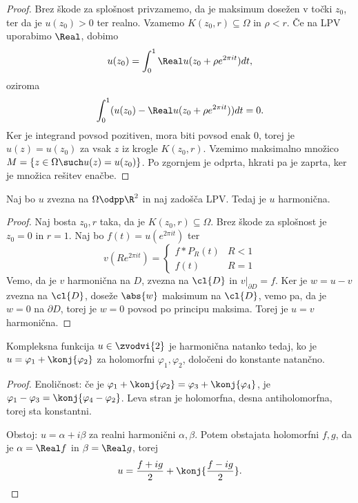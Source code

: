 \begin{proof}
  Brez škode za splošnost privzamemo, da je maksimum dosežen v točki $z_0$, ter
  da je $u(z_0) > 0$ ter realno.
  Vzamemo $K(z_0, r) \subseteq \Omega$ in $\rho < r$.
  Če na LPV uporabimo $\Real$, dobimo
  \[
	u(z_0) = \int_0^1 \Real u(z_0 + \rho e^{2 \pi i t}) dt,
  \]
  oziroma
  \[
	\int_0^1 (u(z_0) - \Real u(z_0 + \rho e^{2 \pi i t})) dt = 0.
  \]
  Ker je integrand povsod pozitiven, mora biti povsod enak $0$, torej je $u(z) =
  u(z_0)$ za vsak $z$ iz krogle $K(z_0, r)$.
  Vzemimo maksimalno množico $M = \{z \in \Omega \such u(z) = u(z_0)\}$.
  Po zgornjem je odprta, hkrati pa je zaprta, ker je množica rešitev enačbe.
\end{proof}


\begin{posledica}
  Naj bo $u$ zvezna na $\Omega\odpp\R^2$ in naj zadošča LPV.
  Tedaj je $u$ harmonična.
\end{posledica}

\begin{proof}
  Naj bosta $z_0, r$ taka, da je $K(z_0, r) \subseteq \Omega$.
  Brez škode za splošnost je $z_0 = 0$ in $r = 1$.
  Naj bo $f(t) = u(e^{2 \pi i t})$ ter
  \[
	v(R e^{2 \pi i t}) =
	\begin{cases}
	  f * P_R(t) & R < 1 \\
	  f(t) & R = 1
	\end{cases}
  \]
  Vemo, da je $v$ harmonična na $D$, zvezna na $\cl{D}$ in $\left. v
  \right|_{\partial D} = f$.
  Ker je $w = u-v$ zvezna na $\cl{D}$, doseže $\abs{w}$ maksimum na $\cl{D}$,
  vemo pa, da je $w = 0$ na $\partial D$, torej je $w = 0$ povsod po principu
  maksima.
  Torej je $u = v$ harmonična.
\end{proof}


\begin{izrek}
  Kompleksna funkcija $u \in \zvodvi{2}$ je harmonična natanko tedaj, ko je $u =
  \varphi_1 + \konj{\varphi_2}$ za holomorfni $\varphi_1, \varphi_2$, določeni
  do konstante natančno.
\end{izrek}

\begin{proof}
  Enoličnost: če je $\varphi_1 + \konj{\varphi_2} = \varphi_3 +
  \konj{\varphi_4}$, je $\varphi_1 - \varphi_3 = \konj{\varphi_4 - \varphi_2}$.
  Leva stran je holomorfna, desna antiholomorfna, torej sta konstantni.

  Obstoj: $u = \alpha + i \beta$ za realni harmonični $\alpha, \beta$.
  Potem obstajata holomorfni $f, g$, da je $\alpha = \Real f$ in $\beta = \Real
  g$, torej
  \[
	u = \frac{f + ig}{2} + \konj{\frac{f - ig}{2}}.
  \]
\end{proof}

